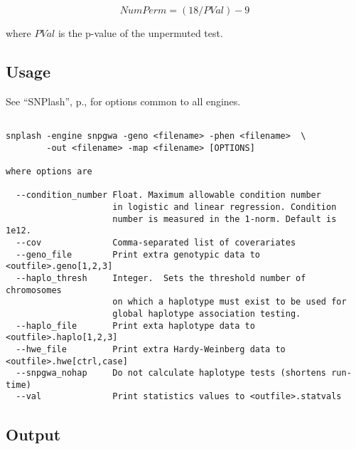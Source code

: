 \begin{equation*}
  NumPerm = \left(18/PVal\right)-9
\end{equation*}

\noindent{}where $PVal$  is the p-value of the unpermuted test.

\subsection{Usage}
See ``SNPlash'', p.\pageref{sec:snplash}, for options common to all engines.
\begin{verbatim}

snplash -engine snpgwa -geno <filename> -phen <filename>  \
        -out <filename> -map <filename> [OPTIONS]

where options are

  --condition_number Float. Maximum allowable condition number
                     in logistic and linear regression. Condition
                     number is measured in the 1-norm. Default is 1e12.
  --cov              Comma-separated list of coverariates
  --geno_file        Print extra genotypic data to <outfile>.geno[1,2,3]
  --haplo_thresh     Integer.  Sets the threshold number of chromosomes
                     on which a haplotype must exist to be used for
                     global haplotype association testing.
  --haplo_file       Print exta haplotype data to <outfile>.haplo[1,2,3]
  --hwe_file         Print extra Hardy-Weinberg data to <outfile>.hwe[ctrl,case]
  --snpgwa_nohap     Do not calculate haplotype tests (shortens run-time)
  --val              Print statistics values to <outfile>.statvals

\end{verbatim}

\subsection{Output}

